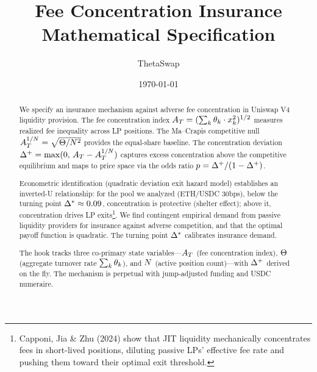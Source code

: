\documentclass[11pt,a4paper]{article}
\title{Fee Concentration Insurance\\[4pt]
       \large Mathematical Specification}
\author{ThetaSwap}
\date{\today}
\begin{document}
\maketitle

\begin{abstract}
We specify an insurance mechanism against adverse fee concentration in
Uniswap V4 liquidity provision. The fee concentration index
$A_T = (\sum_k \theta_k \cdot x_k^2)^{1/2}$ measures realized fee
inequality across LP positions. The Ma--Crapis competitive null
$A_T^{1/N} = \sqrt{\Theta/N^2}$ provides the equal-share baseline.
The concentration deviation $\Delta^{+} = \max(0,\, A_T - A_T^{1/N})$
captures excess concentration above the competitive equilibrium and maps to
price space via the odds ratio $p = \Delta^{+}/(1-\Delta^{+})$.

Econometric identification (quadratic deviation exit hazard model) establishes
an inverted-U relationship: for the pool we analyzed (ETH/USDC 30bps),
below the turning point $\Delta^{*} \approx 0.09$, concentration is protective
(shelter effect); above it, concentration drives LP
exits\footnote{Capponi, Jia \& Zhu (2024) show that JIT liquidity
mechanically concentrates fees in short-lived positions, diluting passive LPs'
effective fee rate and pushing them toward their optimal exit threshold.}.
We find contingent empirical demand from passive liquidity providers for
insurance against adverse competition, and that the optimal payoff function
is quadratic. The turning point $\Delta^{*}$ calibrates insurance demand.

The hook tracks three co-primary state variables---$A_T$ (fee concentration
index), $\Theta$ (aggregate turnover rate $\sum_k \theta_k$), and
$N$ (active position count)---with $\Delta^{+}$ derived on the fly.
The mechanism is perpetual with jump-adjusted funding and USDC numeraire.
\end{abstract}

\tableofcontents












\end{document}
